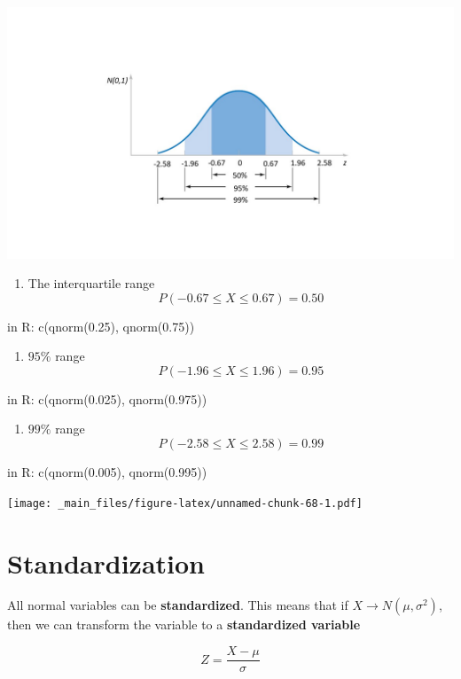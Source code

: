 \documentclass[
]{book}
\providecommand{\tightlist}{%
  \setlength{\itemsep}{0pt}\setlength{\parskip}{0pt}}
\begin{document}
\includegraphics{./figures/phi.JPG}

\begin{enumerate}
\def\labelenumi{\arabic{enumi})}
\tightlist
\item
  The interquartile range \[P(-0.67 \leq X \leq 0.67)=0.50\]
\end{enumerate}

in R: c(qnorm(0.25), qnorm(0.75))

\begin{enumerate}
\def\labelenumi{\arabic{enumi})}
\setcounter{enumi}{1}
\tightlist
\item
  \(95\%\) range \[P(-1.96 \leq X \leq 1.96)=0.95\]
\end{enumerate}

in R: c(qnorm(0.025), qnorm(0.975))

\begin{enumerate}
\def\labelenumi{\arabic{enumi})}
\setcounter{enumi}{2}
\tightlist
\item
  \(99\%\) range \[P(-2.58 \leq X \leq 2.58)=0.99\]
\end{enumerate}

in R: c(qnorm(0.005), qnorm(0.995))

\texttt{[image: \_main\_files/figure-latex/unnamed-chunk-68-1.pdf]}

\hypertarget{standardization}{%
\section{Standardization}\label{standardization}}

All normal variables can be \textbf{standardized}. This means that if \(X \rightarrow N(\mu, \sigma^2)\), then we can transform the variable to
a \textbf{standardized variable}

\[Z=\frac{X-\mu}{\sigma}\]
\end{document}
